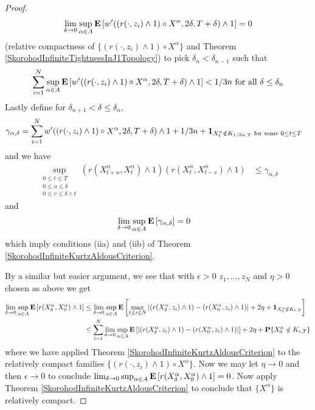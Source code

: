 \begin{proof}
\begin{align*}
\lim_{\delta \to 0} \sup_{\alpha \in A} \textbf{E}\left[w^\prime((r(\cdot , z_i) \wedge 1) \circ X^\alpha, 2\delta, T+ \delta) \wedge 1\right]=0
\end{align*} 
(relative compactness of $\lbrace (r(\cdot, z_i) \wedge 1) \circ X^\alpha \rbrace$ and Theorem \ref{SkorohodInfiniteTightnessInJ1Topology}) to pick $\delta_n < \delta_{n-1}$ such that 
\begin{align*}
\sum_{i=1}^N \sup_{\alpha \in A} \textbf{E}\left[w^\prime((r(\cdot , z_i) \wedge 1) \circ X^\alpha, 2\delta, T+ \delta) \wedge 1\right] < 1/3n \text{ for all } \delta \leq \delta_n
\end{align*}  
Lastly define for $\delta_{n+1} < \delta \leq \delta_n$, 
\begin{align*}
\gamma_{\alpha, \delta} &= \sum_{i=1}^N w^\prime((r(\cdot , z_i) \wedge 1) \circ X^\alpha, 2\delta, T+ \delta) \wedge 1 + 1/3n + \textbf{1}_{X^\alpha_t \notin K_{1/3n, T} \text{ for some } 0 \leq t \leq T} 
\end{align*}
and we have 
\begin{align*}
\sup_{\substack{0 \leq t \leq T \\ 0 \leq u \leq \delta \\ 0 \leq v \leq \delta \wedge t}}
(r(X^\alpha_{t + u}, X^\alpha_t) \wedge 1) (r(X^\alpha_{t}, X^\alpha_{t-v}) \wedge 1) 
&\leq \gamma_{\alpha, \delta} 
\end{align*}
and
\begin{align*}
\lim_{\delta \to 0} \sup_{\alpha \in A} \textbf{E}\left[\gamma_{\alpha, \delta}\right] &= 0
\end{align*}
which imply conditions (iia) and (iib) of Theorem \ref{SkorohodInfiniteKurtzAldousCriterion}.

By a similar but easier argument, we see that with $\epsilon > 0$ $z_1, \dotsc, z_N$ and $\eta>0$ chosen as above we get
\begin{align*}
\lim_{\delta \to 0} \sup_{\alpha \in A} \textbf{E}\left[r(X^\alpha_\delta, X^\alpha_0) \wedge 1\right] 
&\leq \lim_{\delta \to 0} \sup_{\alpha \in A} \textbf{E}\left[\max_{1 \leq i \leq N} \left \vert (r(X^\alpha_\delta, z_i) \wedge 1) - (r(X^\alpha_0, z_i) \wedge 1) \right \vert + 2\eta + \textbf{1}_{X^\alpha_0 \notin K_{\epsilon, T}}\right] \\
&\leq \sum_{i=1}^N \lim_{\delta \to 0} \sup_{\alpha \in A} 
\textbf{E}\left[\left \vert (r(X^\alpha_\delta, z_i) \wedge 1) - (r(X^\alpha_0, z_i) \wedge 1) \right \vert\right]+ 
2\eta + 
\textbf{P}\{X^\alpha_0 \notin K_{\epsilon, T}\}\\
\end{align*}
where we have applied Theorem \ref{SkorohodInfiniteKurtzAldousCriterion} to the relatively compact families $\lbrace (r(\cdot , z_i) \wedge 1) \circ X^\alpha \rbrace$.  Now we may let $\eta \to 0$ and then $\epsilon \to 0$ to conclude $\lim_{\delta \to 0} \sup_{\alpha \in A} \textbf{E}\left[r(X^\alpha_\delta, X^\alpha_0) \wedge 1\right] = 0$.  Now apply Theorem \ref{SkorohodInfiniteKurtzAldousCriterion} to conclude that $\lbrace X^\alpha \rbrace$ is relatively compact.
\end{proof}

